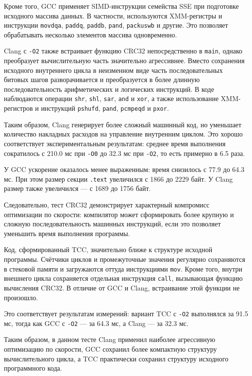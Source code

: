 \documentclass[12pt,a4paper]{article}
\begin{document}
Кроме того, GCC применяет SIMD-инструкции семейства SSE при подготовке исходного массива данных. В частности, используются XMM-регистры и инструкции \texttt{movdqa}, \texttt{paddq}, \texttt{paddb}, \texttt{pand}, \texttt{packuswb} и другие. Это позволяет обрабатывать несколько элементов массива одновременно.

Clang с \texttt{-O2} также встраивает функцию CRC32 непосредственно в \texttt{main}, однако преобразует вычислительную часть значительно агрессивнее. Вместо сохранения исходного внутреннего цикла в неизменном виде часть последовательных битовых шагов разворачивается и преобразуется в более длинную последовательность арифметических и логических инструкций. В коде наблюдаются операции \texttt{shr}, \texttt{shl}, \texttt{sar}, \texttt{and} и \texttt{xor}, а также использование XMM-регистров и инструкций \texttt{pshufd}, \texttt{pand}, \texttt{pcmpeqd} и \texttt{pxor}.

Таким образом, Clang генерирует более сложный машинный код, но уменьшает количество накладных расходов на управление внутренним циклом. Это хорошо соответствует экспериментальным результатам: среднее время выполнения сократилось с 210.0 мс при \texttt{-O0} до 32.3 мс при \texttt{-O2}, то есть примерно в 6.5 раза.

У GCC ускорение оказалось менее выраженным: время снизилось с 77.9 до 64.3 мс. При этом размер секции \texttt{.text} увеличился с 1866 до 2229 байт. У Clang размер также увеличился --- с 1689 до 1756 байт.

Следовательно, тест CRC32 демонстрирует характерный компромисс оптимизации по скорости: компилятор может сформировать более крупную и сложную последовательность машинных инструкций, если это позволяет уменьшить время выполнения программы.

Код, сформированный TCC, значительно ближе к структуре исходной программы. Счётчики циклов и промежуточные значения регулярно сохраняются в стековой памяти и загружаются оттуда инструкциями \texttt{mov}. Кроме того, внутри внешнего цикла сохраняется отдельная инструкция \texttt{call}, вызывающая функцию вычисления CRC32. В отличие от GCC и Clang, встраивание этой функции не произошло.

Это соответствует результатам измерений: вариант TCC с \texttt{-O2} выполнялся за 91.5 мс, тогда как GCC с \texttt{-O2} --- за 64.3 мс, а Clang --- за 32.3 мс.

Таким образом, в данном тесте Clang применил наиболее агрессивную оптимизацию по скорости, GCC сохранил более компактную структуру вычислительного цикла, а TCC практически сохранил структуру исходного программного кода.
\end{document}
